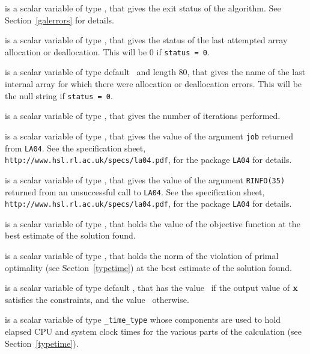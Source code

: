 \begin{description}

 is a scalar variable of type \integer, that gives the
exit status of the algorithm.
See Section~\ref{galerrors}
for details.

 is a scalar variable of type \integer, that gives
the status of the last attempted array allocation or deallocation.
This will be 0 if {\tt status = 0}.

 is a scalar variable of type default \character\
and length 80, that  gives the name of the last internal array
for which there were allocation or deallocation errors.
This will be the null string if {\tt status = 0}.

 is a scalar variable of type \integer, that
gives the number of iterations performed.

 is a scalar variable of type \integer, that
gives the value of the argument {\tt job} returned from {\tt LA04}.
See the specification sheet,
{\tt http://www.hsl.rl.ac.uk/specs/la04.pdf},
for the package {\tt LA04} for details.

 is a scalar variable of type \integer, that
gives the value of the argument {\tt RINFO(35)} returned from an
unsuccessful call to {\tt LA04}.
See the specification sheet,
{\tt http://www.hsl.rl.ac.uk/specs/la04.pdf},
for the package {\tt LA04} for details.

 is a scalar variable of type \realdp, that holds the
value of the objective function at the best estimate of the solution found.

 is a scalar variable of type \realdp,
that holds the norm of the violation of primal optimality
(see Section~\ref{typetime}) at the best estimate of the solution found.

 is a scalar variable of type default \logical, that has the
value \true\ if the output value of ${\mathbf{x}}$ satisfies the constraints,
and the value \false\ otherwise.

 is a scalar variable of type {\tt \packagename\_time\_type}
whose components are used to hold elapsed CPU and system clock times for the
various parts of the calculation (see Section~\ref{typetime}).

\end{description}
